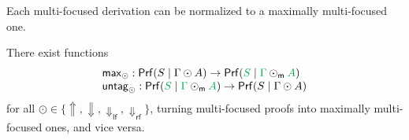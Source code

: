 \documentclass[runningheads]{llncs}
\newcommand{\lfm}{\dn_\mathsf{lfm}}%
\newcommand{\rfm}{\dn_\mathsf{rfm}}%
\newcommand{\lf}{\dn_\mathsf{lf}}%
\newcommand{\rf}{\dn_\mathsf{rf}}%
\newcommand{\green}[1]{{\color{Green}#1}}
\newcommand{\up}{\Uparrow}
\newcommand{\dn}{\Downarrow}
\newcommand{\upm}{\Uparrow_{\mathsf{m}}}
\newcommand{\dnm}{\Downarrow_{\mathsf{m}}}
\newcommand{\Prf}{\mathsf{Prf}}
\begin{document}
Each multi-focused derivation can be normalized to a maximally multi-focused one. %
\begin{theorem}\label{thm2}
  There exist functions
  \[
  \begin{array}{l}%
    \mathsf{max}_\odot : \Prf(S \mid \Gamma \odot A) \to \Prf(\green{S} \mid \green{\Gamma} \odot_\mathsf{m} \green{A}) \\
    \mathsf{untag}_\odot : \Prf(\green{S} \mid \green{\Gamma} \odot_{\mathsf{m}} \green{A}) \to \Prf(S \mid \Gamma \odot A) %
  \end{array}
  \]
 for all $\odot \in \{\up,\dn,\lf,\rf \}$, turning multi-focused proofs into maximally multi-focused ones, and vice versa.
\end{theorem}
\end{document}
